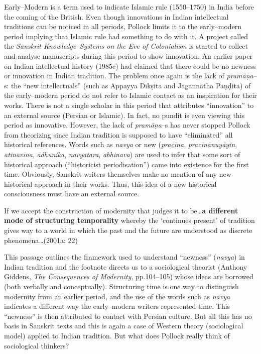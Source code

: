Early–Modern is a term used to indicate Islamic rule (1550–1750) in India before the coming of the British. Even though innovations in Indian intellectual traditions can be noticed in all periods, Pollock limits it to the early–modern period implying that Islamic rule had something to do with it. A project called the \textit{Sanskrit Knowledge–Systems on the Eve of Colonialism} is started to collect and analyse manuscripts during this period to show innovation. An earlier paper on Indian intellectual history (1985c) had claimed that there could be no newness or innovation in Indian tradition. The problem once again is the lack of \textit{pramāṇa}–s: the “new intellectuals” (such as Appayya Dīkṣita and Jagannātha Paṇḍita) of the early–modern period do not refer to Islamic contact as an inspiration for their works. There is not a single scholar in this period that attributes “innovation” to an external source (Persian or Islamic). In fact, no pundit is even viewing this period as innovative. However, the lack of \textit{pramāṇa}–s has never stopped Pollock from theorizing since Indian tradition is supposed to have “eliminated” all historical references. Words such as \textit{navya} or new (\textit{pracīna},\textit{ pracīnānuyāyin},\textit{ atinavīna},\textit{ ādhunika},\textit{ navyatara},\textit{ abhinava}) are used to infer that some sort of historical approach (“historicist periodisation”) came into existence for the first time. Obviously, Sanskrit writers themselves make no mention of any new historical approach in their works. Thus, this idea of a new historical consciousness must have an external source.

\begin{myquote}
If we accept the construction of modernity that judges it to be…\textbf{a different mode of structuring temporality} whereby the ‘continues present’ of tradition gives way to a world in which the past and the future are understood as discrete phenomena…(2001a: 22)
\end{myquote}

This passage outlines the framework used to understand “newness” (\textit{navya}) in Indian tradition and the footnote directs us to a sociological theorist (Anthony Giddens, \textit{The Consequences of Modernity}, pp.104–105) whose ideas are borrowed (both verbally and conceptually). Structuring time is one way to distinguish modernity from an earlier period, and the use of the words such as \textit{navya }indicates a different way the early–modern writers represented time. This “newness” is then attributed to contact with Persian culture. But all this has no basis in Sanskrit texts and this is again a case of Western theory (sociological model) applied to Indian tradition. But what does Pollock really think of sociological thinkers?

